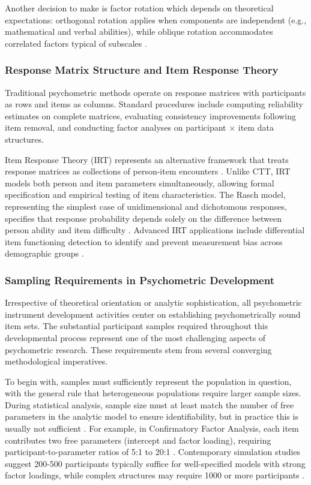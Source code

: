 \documentclass[
  authoryear,
  review]{elsarticle}
\begin{document}
Another decision to make is factor rotation which depends on theoretical
expectations: orthogonal rotation applies when components are
independent (e.g., mathematical and verbal abilities), while oblique
rotation accommodates correlated factors typical of subscales
\citep{Fabrigar1999}.

\subsubsection{Response Matrix Structure and Item Response
Theory}\label{response-matrix-structure-and-item-response-theory}

Traditional psychometric methods operate on response matrices with
participants as rows and items as columns. Standard procedures include
computing reliability estimates on complete matrices, evaluating
consistency improvements following item removal, and conducting factor
analyses on participant × item data structures.

Item Response Theory (IRT) represents an alternative framework that
treats response matrices as collections of person-item encounters
\citep{Embretson2013}. Unlike CTT, IRT models both person and item
parameters simultaneously, allowing formal specification and empirical
testing of item characteristics. The Rasch model, representing the
simplest case of unidimensional and dichotomous responses, specifies
that response probability depends solely on the difference between
person ability and item difficulty \citep{Rasch1960}. Advanced IRT
applications include differential item functioning detection to identify
and prevent measurement bias across demographic groups
\citep{Penfield2000}.

\subsubsection{Sampling Requirements in Psychometric
Development}\label{sampling-requirements-in-psychometric-development}

Irrespective of theoretical orientation or analytic sophistication, all
psychometric instrument development activities center on establishing
psychometrically sound item sets. The substantial participant samples
required throughout this developmental process represent one of the most
challenging aspects of psychometric research. These requirements stem
from several converging methodological imperatives.

To begin with, samples must sufficiently represent the population in
question, with the general rule that heterogeneous populations require
larger sample sizes. During statistical analysis, sample size must at
least match the number of free parameters in the analytic model to
ensure identifiability, but in practice this is usually not sufficient
\citep{Bollen1990}. For example, in Confirmatory Factor Analysis, each
item contributes two free parameters (intercept and factor loading),
requiring participant-to-parameter ratios of 5:1 to 20:1
\citep{Brown2015}. Contemporary simulation studies suggest 200-500
participants typically suffice for well-specified models with strong
factor loadings, while complex structures may require 1000 or more
participants \citep{Wolf2013}.
\end{document}
